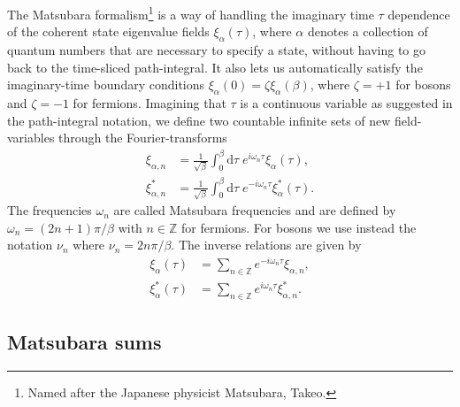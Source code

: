 The Matsubara formalism\footnote{Named after the Japanese physicist Matsubara, Takeo.} is a way of handling the imaginary time $\tau$
dependence of the coherent state eigenvalue fields $\xi_\alpha(\tau)$, where $\alpha$ denotes
a collection of quantum numbers that are necessary to specify a state, without having to go back to the time-sliced path-integral. It also lets us
automatically satisfy the imaginary-time boundary conditions $\xi_\alpha(0) = \zeta\xi_\alpha(\beta)$, where $\zeta = +1$ for bosons
and $\zeta = -1$ for fermions. Imagining that $\tau$ is a continuous
variable as suggested in the path-integral notation, we define two countable infinite sets of new field-variables through the Fourier-transforms
\begin{subequations}
    \label{eq:Field:Mats:transformDef}
    \begin{align}
    \xi_{\alpha,n} &= \frac{1}{\sqrt{\beta}}\int_0^\beta\!\!\mathrm{d}\tau\;e^{i\omega_n\tau}\xi_\alpha(\tau),\label{eq:Field:Mats:transformDef:xi}\\
    \xi_{\alpha,n}^\ast &= \frac{1}{\sqrt{\beta}}\int_0^\beta\!\!\mathrm{d}\tau\;e^{-i\omega_n\tau}\xi_\alpha^\ast(\tau).\label{eq:Field:Mats:transformDef:xiAst}
    \end{align}
\end{subequations}
The frequencies $\omega_n$ are called Matsubara frequencies and are defined by $\omega_n = (2n+1)\pi/\beta$ with $n\in\mathbb{Z}$ for fermions. For bosons we use instead the notation
$\nu_n$ where $\nu_n = 2n\pi/\beta$. The inverse relations are given by 
\begin{subequations}
    \label{eq:Field:Mats:inverseTransform}
    \begin{align}
        \xi_\alpha(\tau) &= \sum_{n\in\mathbb{Z}}e^{-i\omega_n\tau}\xi_{\alpha,n},\label{eq:Field:Mats:inverseTransform:xi}\\
        \xi_\alpha^\ast(\tau) &= \sum_{n\in\mathbb{Z}}e^{i\omega_n\tau}\xi_{\alpha,n}^\ast.\label{eq:Field:Mats:inverseTransform:xiAst}
    \end{align}
\end{subequations}

\subsection{Matsubara sums}


